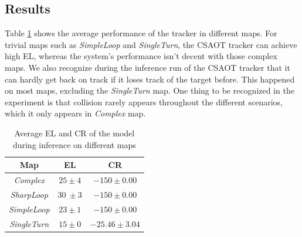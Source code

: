 \documentclass[sigconf]{aamas}
\begin{document}
\subsection{Results}
Table \ref{tab:metrics} shows the average performance of the tracker in different maps. For trivial maps such as \textit{SimpleLoop} and \textit{SingleTurn}, the CSAOT tracker can achieve high EL, whereas the system's performance isn't decent with those complex maps. We also recognize during the inference run of the CSAOT tracker that it can hardly get back on track if it loses track of the target before. This happened on most maps, excluding the \textit{SingleTurn} map. One thing to be recognized in the experiment is that collision rarely appears throughout the different scenarios, which it only appears in \textit{Complex} map.
\begin{table}[h!]
    \centering
    \begin{tabular}{|c|c|c|}
        \hline
        \textbf{Map} & \textbf{EL} & \textbf{CR} \\
        \hline
        \textit{Complex} & \(25 \pm 4\) & \(-150 \pm 0.00\)\\
        \hline
        \textit{SharpLoop} & \(30\ \pm 3\) & \(-150 \pm 0.00\)\\
        \hline
        \textit{SimpleLoop} & \(23 \pm 1\) & \(-150 \pm 0.00\)\\
        \hline
        \textit{SingleTurn} & \(15 \pm 0\)& \(-25.46 \pm 3.04\)\\
        \hline
    \end{tabular}
    \caption{Average EL and CR of the model during inference on different maps}
    \label{tab:metrics}
\end{table}
\end{document}

